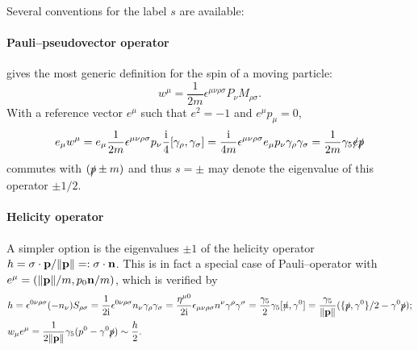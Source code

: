 \documentclass[CheatSheet]{subfiles}
\begin{document}
Several conventions for the label $s$ are available:\vspace{-1em}
\begin{DownPara}
\paragraph{Pauli--\Lubanski pseudovector operator} gives the most generic definition for the spin of a moving particle:
\begin{equation}
 w^\mu = \frac1{2m}\epsilon^{\mu\nu\rho\sigma}P_\nu M_{\rho\sigma}.
\end{equation}
With a reference vector $e^\mu$ such that $e^2=-1$ and $e^\mu p_\mu=0$,
\begin{equation}
 e_\mu w^\mu
= e_\mu \frac1{2m} \epsilon^{\mu\nu\rho\sigma}p_\nu \frac{{\mathrm{i}}}{4}[\gamma_\rho,\gamma_\sigma]
= \frac{{\mathrm{i}}}{4m} \epsilon^{\mu\nu\rho\sigma}e_\mu p_\nu \gamma_\rho\gamma_\sigma
= \frac1{2m}\gamma_5 \slashed e \slashed p
\end{equation}
commutes with $(\slashed p\pm m)$ and thus $s=\pm$ may denote the eigenvalue of this operator $\pm1/2$.


\paragraph{Helicity operator}
A simpler option is the eigenvalues $\pm1$ of the helicity operator $h={\mathbf{\sigma}}\cdot{\mathbf{p}}/\|{\mathbf{p}}\|=:{\mathbf{\sigma}}\cdot{\mathbf{n}}$.
This is in fact a special case of Pauli--\Lubanski operator with $e^\mu= (\|{\mathbf{p}}\|/m,p_0{\mathbf{n}}/m)$, which is verified by
\begin{align}
& h
=\epsilon^{0\nu\rho\sigma}(-n_\nu) S_{\rho\sigma}
=\frac{1}{2{\mathrm{i}}}\epsilon^{0\nu\rho\sigma}n_\nu \gamma_\rho\gamma_\sigma
=\frac{\eta^{\mu0}}{2{\mathrm{i}}}\epsilon_{\mu\nu\rho\sigma}n^\nu \gamma^\rho\gamma^\sigma
=\frac{\gamma_5}{2}\gamma_5[\slashed{n},\gamma^0]
=\frac{\gamma_5}{\|{\mathbf{p}}\|}({\{\slashed{p},\gamma^0\}}/{2}-\gamma^0\slashed{p});
\\&
w_\mu e^\mu 
=\frac{1}{2\|{\mathbf{p}}\|}\gamma_5(p^0-\gamma^0\slashed{p})\sim \frac{h}{2}.
\end{align}



\end{DownPara}
\end{document}
